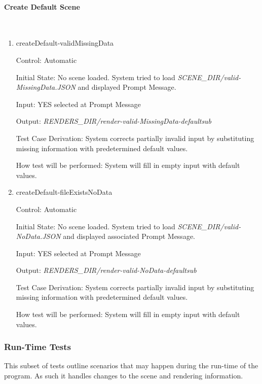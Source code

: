 \documentclass[12pt, titlepage]{article}
\begin{document}
\paragraph{Create Default Scene}
~\newline
\begin{enumerate}
	
	\item{createDefault-validMissingData\\}
	
	Control: Automatic

	Initial State: No scene loaded.	System tried to load 
	\textit{SCENE\_DIR/valid-MissingData.JSON} and displayed Prompt Message.

	Input: YES selected at Prompt Message
	
	Output: \textit{RENDERS\_DIR/render-valid-MissingData-defaultsub}
	
	Test Case Derivation: System corrects partially invalid input by 
	substituting missing information with predetermined default values.
	
	How test will be performed: System will fill in empty input with default 
	values.
	
	\item{createDefault-fileExistsNoData\\}
	
	Control: Automatic
	
	Initial State: No scene loaded.	System tried to load 
	\textit{SCENE\_DIR/valid-NoData.JSON} and displayed associated Prompt 
	Message.
	
	Input: YES selected at Prompt Message
	
	Output: \textit{RENDERS\_DIR/render-valid-NoData-defaultsub}
	
	Test Case Derivation: System corrects partially invalid input by 
	substituting missing information with predetermined default values.
	
	How test will be performed: System will fill in empty input with default 
	values.	
	
\end{enumerate}

\subsubsection{Run-Time Tests}
This subset of tests outline scenarios that may happen during the run-time of 
the program. As such it handles changes to the scene and rendering information.
\end{document}
